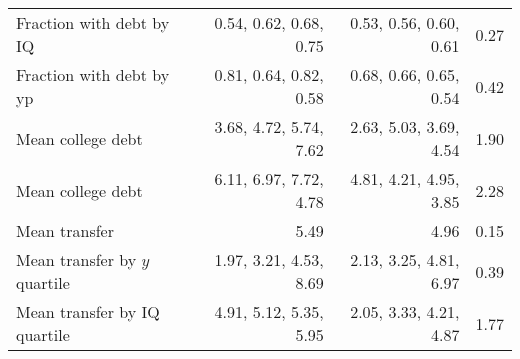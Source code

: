 \begin{tabular}{lrrr}
Fraction with debt by IQ & 0.54, 0.62, 0.68, 0.75  & 0.53, 0.56, 0.60, 0.61  & 0.27  \\ 
Fraction with debt by yp & 0.81, 0.64, 0.82, 0.58  & 0.68, 0.66, 0.65, 0.54  & 0.42  \\ 
Mean college debt & 3.68, 4.72, 5.74, 7.62  & 2.63, 5.03, 3.69, 4.54  & 1.90  \\ 
Mean college debt & 6.11, 6.97, 7.72, 4.78  & 4.81, 4.21, 4.95, 3.85  & 2.28  \\ 
Mean transfer & 5.49  & 4.96  & 0.15  \\ 
Mean transfer by $y$ quartile & 1.97, 3.21, 4.53, 8.69  & 2.13, 3.25, 4.81, 6.97  & 0.39  \\ 
Mean transfer by IQ quartile & 4.91, 5.12, 5.35, 5.95  & 2.05, 3.33, 4.21, 4.87  & 1.77  \\ 
\hline
\end{tabular}%
